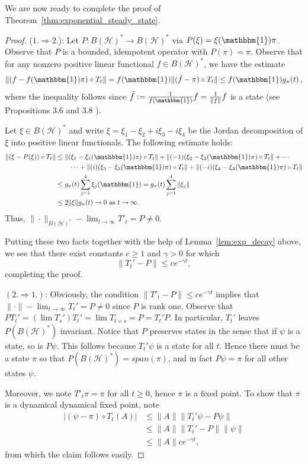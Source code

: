 \documentclass{article}
\newcommand{\one}{\mathbbm{1}}
\newcommand{\<}{\langle}
\renewcommand{\>}{\rangle}
\numberwithin{equation}{section}
\theoremstyle{definition}
\begin{document}
We are now ready to complete the proof of Theorem~\ref{thm:exponential_steady_state}. 
\begin{proof}
	($1.\Rightarrow 2.$):  Let $P:B(\mathcal{H})^* \to B(\mathcal{H})^*$ via $P(\xi) = \xi(\one) \pi$.  Observe that $P$ is a bounded, idempotent operator with $P(\pi) = \pi$. Observe that for any nonzero positive linear functional $f\in B(\mathcal{H})^*$, we have the estimate 
	\[
		\|(f - f(\one)\pi)\circ T_t\| = f(\one) \|( \tilde f - \pi) \circ T_t\| \le f(\one) g_\pi(t)\,,
	\] where the inequality follows since $\tilde f := \frac{1}{f(\one)}f = \frac{1}{\|f\|} f$ is a state (see Propositions 3.6 and 3.8 \cite{Paulsen}).  
	
	Let $\xi \in B(\mathcal{H})^*$ and write $\xi = \xi_1 - \xi_2 +i\xi_3 - i \xi_4$ be the Jordan decomposition of $\xi$ into positive linear functionals. The following estimate holds: \begin{align*}
    \|(\xi - P(\xi))\circ T_t\| &\le \|(\xi_1 - \xi_1(\one)\pi )\circ T_t\|+\|(-1)(\xi_2 - \xi_2(\one)\pi )\circ T_t\|+\cdots\\
    &\qquad \cdots +\|(i)(\xi_3 - \xi_3(\one)\pi )\circ T_t\|+\|(-i)(\xi_4 - \xi_4(\one)\pi )\circ T_t\|\\
    &\le g_\pi(t)\sum_{j=1}^4 \xi_j(\one) = g_\pi(t) \sum_{j=1}^4 \|\xi_j\| \\
    &\le 2\|\xi\|g_\pi(t) \to 0 \text{ as }t\to \infty.
\end{align*}Thus, $\|\cdot \|_{B(\mathcal{H})^*}-\lim_{t\to \infty} T'_t = P \neq 0$. 

Putting these two facts together with the help of Lemma~\ref{lem:exp_decay} above, we see that there exist constants $c\ge 1$ and $\gamma>0$ for which \begin{equation}
	\|T_t' - P\| \le ce^{-\gamma t},
\end{equation} completing the proof.

$(2. \Rightarrow 1.)$: Obviously, the condition $\|T'_t - P\| \le ce^{-\gamma t}$ implies that $\|\cdot \|-\lim_{t\to \infty} T_t' = P\neq 0$ since $P$ is rank one. Observe that $PT_t' = (\lim T_s')T_t'
	 = \lim T_{t+s} = P = T_t'P$. In particular, $T_t'$ leaves $P(B(\mathcal{H})^*)$ invariant. Notice that $P$ preserves states in the sense that if $\psi$ is a state, so is $P\psi$. This follows because $T_t'\psi$ is a state for all $t$. Hence there must be a state $\pi$ so that $P(B(\mathcal{H})^*)=span(\pi)$, and in fact $P\psi = \pi$ for all other states $\psi$. 
	 
	 Moreover, we note  $T'_t \pi = \pi$ for all $t\ge 0$, hence $\pi$ is a fixed point. To show that $\pi$ is a dynamical dynamical fixed point, note
	\begin{align*}
		|(\psi - \pi)\circ T_t(A)| &\le \|A\| \|T_t'\psi - P\psi \|\\
		&\le \|A\| \|T_t' - P\| \|\psi\|\\
		&\le \|A\|ce^{-\gamma t},
	\end{align*} from which the claim follows easily.
\end{proof}
\end{document}
